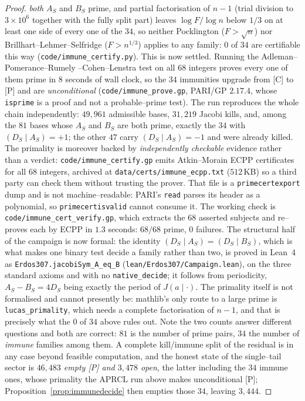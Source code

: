 \documentclass[11pt]{article}
\theoremstyle{definition}
\begin{document}
\begin{proof}
\emph{both} $A_S$ and $B_S$ prime, and partial factorisation of $n-1$ (trial division to
$3\times10^6$ together with the fully split part) leaves $\log F/\log n$ below $1/3$ on at least one
side of every one of the $34$, so neither Pocklington ($F>\sqrt n$) nor
Brillhart--Lehmer--Selfridge ($F>n^{1/3}$) applies to any family: $0$ of $34$ are certifiable this
way (\texttt{code/immune\_certify.py}). This is now settled. Running the Adleman--Pomerance--Rumely
--Cohen--Lenstra test on all $68$ integers proves every one of them prime in $8$ seconds of
wall clock, so the $34$ immunities upgrade from \textup{[C]} to \textup{[P]} and are
\emph{unconditional} (\texttt{code/immune\_prove.gp}, PARI/GP $2.17.4$, whose \texttt{isprime} is a
proof and not a probable--prime test). The run reproduces the whole chain independently: $49{,}961$
admissible bases, $31{,}219$ Jacobi kills, and, among the $81$ bases whose $A_S$ and $B_S$ are both
prime, exactly the $34$ with $(D_S\mid A_S)=+1$; the other $47$ carry $(D_S\mid A_S)=-1$ and were
already killed. The primality is moreover backed by
\emph{independently checkable} evidence rather than a verdict: \texttt{code/immune\_certify.gp}
emits Atkin--Morain \textup{ECPP} certificates for all $68$ integers, archived at
\texttt{data/certs/immune\_ecpp.txt} ($512$\,KB) so a third
party can check them without trusting the prover. That file is a \texttt{primecertexport} dump and
is not machine--readable: PARI's \texttt{read} parses its header as a polynomial, so
\texttt{primecertisvalid} cannot consume it. The working check is
\texttt{code/immune\_cert\_verify.gp}, which extracts the $68$ asserted subjects and re--proves each
by \textup{ECPP} in $1.3$ seconds: $68/68$ prime, $0$ failures. The structural half of the campaign is now
formal: the identity $(D_S\mid A_S)=(D_S\mid B_S)$, which is what makes one binary test decide a
family rather than two, is proved in Lean~4 as \texttt{Erdos307.jacobiSym\_A\_eq\_B}
\textup{(\texttt{lean/Erdos307/Campaign.lean})}, on the three standard axioms and with no
\texttt{native\_decide}; it follows from periodicity, $A_S-B_S=4D_S$ being exactly the period of
$J(a\mid\cdot)$. The primality itself is not formalised and cannot presently be: mathlib's only
route to a large prime is \texttt{lucas\_primality}, which needs a complete factorisation of
$n-1$, and that is precisely what the $0$ of $34$ above rules out. Note the two counts answer different questions and both are correct: $81$ is the
number of prime pairs, $34$ the number of \emph{immune} families among them. A complete kill/immune split of the residual is in any case beyond feasible
computation, and the honest state of the single--tail sector is \emph{$46{,}483$ empty
\textup{[P]} and $3{,}478$ open}, the latter including the $34$ immune ones, whose primality the
\textup{APRCL} run above makes unconditional \textup{[P]}; Proposition~\ref{prop:immunedecide} then
empties those $34$, leaving $3{,}444$.
\end{proof}
\end{document}
